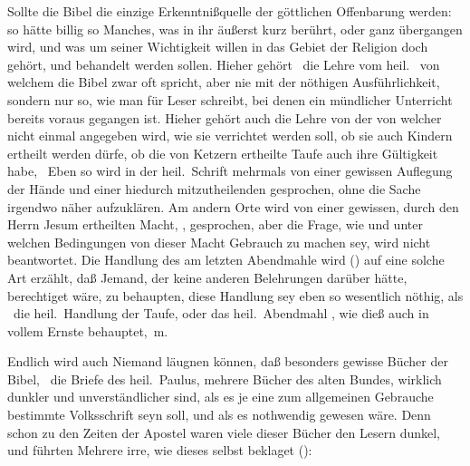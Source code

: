 \begin{aufza}
\begin{aufzb}
\item Sollte die Bibel die einzige Erkenntnißquelle der göttlichen Offenbarung werden: so hätte billig so Manches, was in ihr äußerst kurz berührt, oder ganz übergangen wird, und was um seiner Wichtigkeit willen in das Gebiet der Religion doch gehört,  und  behandelt werden sollen. Hieher gehört \zB\ die Lehre vom heil.\  von welchem die Bibel zwar oft spricht, aber nie mit der nöthigen Ausführlichkeit, sondern nur so, wie man für Leser schreibt, bei denen ein mündlicher Unterricht bereits voraus gegangen ist. Hieher gehört auch die Lehre von der  von welcher nicht einmal angegeben wird, wie sie verrichtet werden soll, ob sie auch Kindern ertheilt werden dürfe, ob die von Ketzern ertheilte Taufe auch ihre Gültigkeit habe, \usw\  Eben so wird in der heil.\ Schrift mehrmals von einer gewissen Auflegung der Hände und einer hiedurch mitzutheilenden  gesprochen, ohne die Sache irgendwo näher aufzuklären. Am andern Orte wird von einer gewissen, durch den Herrn Jesum ertheilten Macht, , gesprochen, aber die Frage, wie und unter welchen Bedingungen von dieser Macht Gebrauch zu machen sey, wird nicht beantwortet. Die Handlung des  am letzten Abendmahle wird () auf eine solche Art erzählt, daß Jemand, der keine anderen Belehrungen darüber hätte, berechtiget wäre, zu behaupten, diese Handlung sey eben so wesentlich nöthig, als \zB\ die heil.\ Handlung der Taufe, oder das heil.\ Abendmahl \udgl , wie dieß auch  in vollem Ernste behauptet, \udgl\,m.
\item Endlich wird auch Niemand läugnen können, daß besonders gewisse Bücher der Bibel, \zB\ die Briefe des heil.\ Paulus, mehrere Bücher des alten Bundes, wirklich dunkler und unverständlicher sind, als es je eine zum allgemeinen Gebrauche bestimmte Volksschrift seyn soll, und als es nothwendig gewesen wäre. Denn schon zu den Zeiten der Apostel waren viele dieser Bücher den Lesern dunkel, und führten Mehrere irre, wie dieses  selbst beklaget (): 
\end{aufzb}
\end{aufza}
